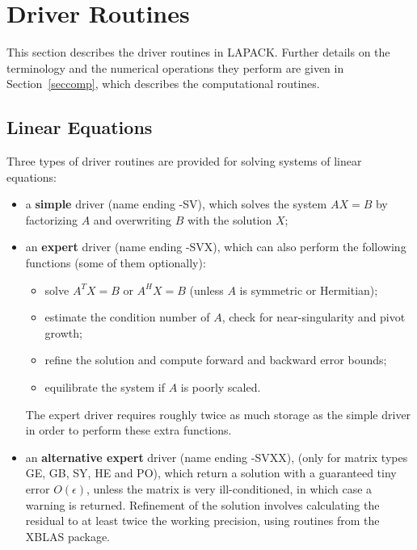 \section{Driver Routines}\label{secdrivers}

This section describes the driver routines
 in LAPACK. Further details on
the terminology and the numerical operations they perform
are given in
Section~\ref{seccomp}, which describes the computational routines.

\subsection{Linear Equations}\label{subsecdrivelineq}

Three types of driver routines are provided for solving systems of linear
equations:

\begin{itemize}

\item a {\bf simple} driver (name ending -SV),
which solves the system
$AX = B$ by
factorizing $A$ and overwriting $B$ with the solution $X$;

\item an {\bf expert} driver (name ending -SVX),
which can also perform the
following functions (some of them optionally):

\begin{itemize}

\item solve $A^T X = B$ or $A^H X = B$ (unless $A$ is symmetric or Hermitian);

\item estimate the condition number of $A$, check for
near-singularity and pivot growth;

\item refine the solution and compute forward and backward error bounds;

\item equilibrate the system if $A$ is poorly scaled.

\end{itemize}

The expert driver requires roughly twice as much storage as the simple
driver in order to perform these extra functions.

\item an {\bf alternative expert} driver (name ending -SVXX),
(only for matrix types GE, GB, SY, HE and PO), which return a solution with a guaranteed tiny
error $O(\epsilon)$, unless the matrix is very ill-conditioned, in which case a warning is returned.
Refinement of the solution involves calculating the residual to at least twice the working precision,
using routines from the XBLAS package. 

\end{itemize}

